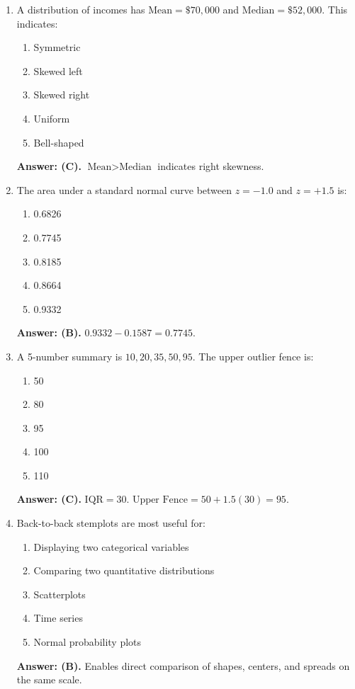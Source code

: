 \begin{enumerate}[resume, leftmargin=1.5em]
  \item A distribution of incomes has $\text{Mean} = \$70,000$ and $\text{Median} = \$52,000$. This indicates:
  \begin{enumerate}[label=(\Alph*)]
    \item Symmetric \item Skewed left \item Skewed right \item Uniform \item Bell-shaped
  \end{enumerate}
  \textbf{Answer: (C).} $\text{Mean} > \text{Median}$ indicates right skewness.

  \item The area under a standard normal curve between $z = -1.0$ and $z = +1.5$ is:
  \begin{enumerate}[label=(\Alph*)]
    \item 0.6826 \item 0.7745 \item 0.8185 \item 0.8664 \item 0.9332
  \end{enumerate}
  \textbf{Answer: (B).} $0.9332 - 0.1587 = 0.7745$.

  \item A 5-number summary is $10, 20, 35, 50, 95$. The upper outlier fence is:
  \begin{enumerate}[label=(\Alph*)]
    \item 50 \item 80 \item 95 \item 100 \item 110
  \end{enumerate}
  \textbf{Answer: (C).} $\text{IQR} = 30$. $\text{Upper Fence} = 50 + 1.5(30) = 95$.

  \item Back-to-back stemplots are most useful for:
  \begin{enumerate}[label=(\Alph*)]
    \item Displaying two categorical variables \item Comparing two quantitative distributions \item Scatterplots \item Time series \item Normal probability plots
  \end{enumerate}
  \textbf{Answer: (B).} Enables direct comparison of shapes, centers, and spreads on the same scale.


\end{enumerate}
